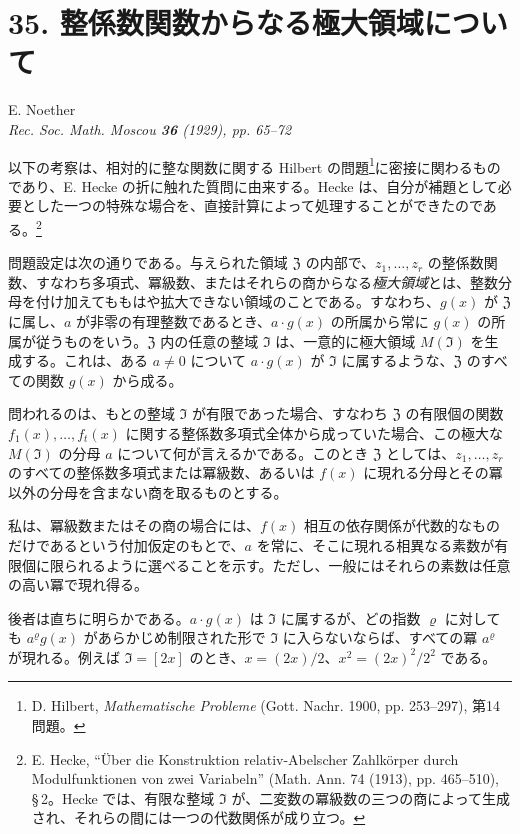 
\clearpage
\section*{35. 整係数関数からなる極大領域について}
\begin{center}
E. Noether\\
\textit{Rec. Soc. Math. Moscou \textbf{36} (1929), pp. 65--72}
\end{center}

以下の考察は、相対的に整な関数に関する Hilbert の問題\footnote{D. Hilbert, \emph{Mathematische Probleme} (Gott. Nachr. 1900, pp. 253--297), 第14問題。}に密接に関わるものであり、E. Hecke の折に触れた質問に由来する。Hecke は、自分が補題として必要とした一つの特殊な場合を、直接計算によって処理することができたのである。\footnote{E. Hecke, ``Über die Konstruktion relativ-Abelscher Zahlkörper durch Modulfunktionen von zwei Variabeln'' (Math. Ann. 74 (1913), pp. 465--510), \S\,2。Hecke では、有限な整域 $\mathfrak{I}$ が、二変数の冪級数の三つの商によって生成され、それらの間には一つの代数関係が成り立つ。}

問題設定は次の通りである。与えられた領域 $\mathfrak{Z}$ の内部で、$z_1,\ldots,z_r$ の整係数関数、すなわち多項式、冪級数、またはそれらの商からなる\emph{極大領域}とは、整数分母を付け加えてももはや拡大できない領域のことである。すなわち、$g(x)$ が $\mathfrak{Z}$ に属し、$a$ が非零の有理整数であるとき、$a\cdot g(x)$ の所属から常に $g(x)$ の所属が従うものをいう。$\mathfrak{Z}$ 内の任意の整域 $\mathfrak{I}$ は、一意的に極大領域 $M(\mathfrak{I})$ を生成する。これは、ある $a\ne0$ について $a\cdot g(x)$ が $\mathfrak{I}$ に属するような、$\mathfrak{Z}$ のすべての関数 $g(x)$ から成る。

問われるのは、もとの整域 $\mathfrak{I}$ が有限であった場合、すなわち $\mathfrak{Z}$ の有限個の関数 $f_1(x),\ldots,f_t(x)$ に関する整係数多項式全体から成っていた場合、この極大な $M(\mathfrak{I})$ の分母 $a$ について何が言えるかである。このとき $\mathfrak{Z}$ としては、$z_1,\ldots,z_r$ のすべての整係数多項式または冪級数、あるいは $f(x)$ に現れる分母とその冪以外の分母を含まない商を取るものとする。

私は、冪級数またはその商の場合には、$f(x)$ 相互の依存関係が代数的なものだけであるという付加仮定のもとで、$a$ を常に、そこに現れる相異なる素数が有限個に限られるように選べることを示す。ただし、一般にはそれらの素数は任意の高い冪で現れ得る。

後者は直ちに明らかである。$a\cdot g(x)$ は $\mathfrak{I}$ に属するが、どの指数 $\varrho$ に対しても $a^\varrho g(x)$ があらかじめ制限された形で $\mathfrak{I}$ に入らないならば、すべての冪 $a^\varrho$ が現れる。例えば $\mathfrak{I}=[2x]$ のとき、$x=(2x)/2$、$x^2=(2x)^2/2^2$ である。

